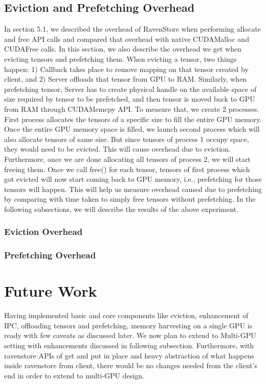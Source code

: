 \documentclass{article}
\begin{document}
\subsection{Eviction and Prefetching Overhead}
In section 5.1, we described the overhead of RavenStore when performing allocate and free API calls and compared that overhead with 
native CUDAMalloc and CUDAFree calls. In this section, we also describe the overhead we get when evicting tensors and prefetching them.
When evicting a tensor, two things happen: 1) Callback takes place to remove mapping on that tensor created by client, and 2) Server
offloads that tensor from GPU to RAM. Similarly, when prefetching tensor, Server has to create physical handle on the available space of
size required by tensor to be prefetched, and then tensor is moved back to GPU from RAM through CUDAMemcpy API.
To measure that, we create 2 processes. First process allocates the tensors of a specific size to fill the entire GPU memory. Once the entire GPU
memory space is filled, we launch second process which will also allocate tensors of same size. But since tensors of process 1 occupy space, they would
need to be evicted. This will cause overhead due to eviction. Furthermore, once we are done allocating all tensors of process 2, we will start freeing them.
Once we call free() for each tensor, tensors of first process which got evicted will now start coming back to GPU memory, i.e., prefetching for those
tensors will happen. This will help us measure overhead caused due to prefetching by comparing with time taken to simply free tensors without prefetching.
In the following subsections, we will describe the results of the above experiment.

\subsubsection{Eviction Overhead}
\subsubsection{Prefetching Overhead}

\section{Future Work}
Having implemented basic and core components like eviction, enhancement of IPC, offloading tensors and prefetching, memory harvesting
on a single GPU is ready with few caveats as discussed later. We now plan
to extend to Multi-GPU setting with enhancements discussed in following subsection. 
Furthermore, with ravenstore APIs of get and put in place and heavy abstraction of what
happens inside ravenstore from client, there would be no changes needed from the client's end
in order to extend to multi-GPU design.
\end{document}
